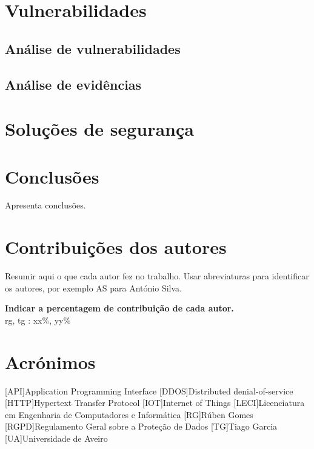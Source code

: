 \documentclass{report}
\begin{document}
\chapter{Vulnerabilidades}
\label{ch:vulnerabilidades}
\section{Análise de vulnerabilidades}
\section{Análise de evidências}

\chapter{Soluções de segurança}
\label{ch:solucoes-de-seguranca}

\chapter{Conclusões}
\label{ch:conclusoes}
Apresenta conclusões.

\chapter*{Contribuições dos autores}
Resumir aqui o que cada autor fez no trabalho.
Usar abreviaturas para identificar os autores,
por exemplo AS para António Silva.

\vspace{10pt}
\textbf{Indicar a percentagem de contribuição de cada autor.}\\

\ac{rg}, \ac{tg} : xx\%, yy\%\\


\chapter*{Acrónimos}
\begin{acronym}
    [API]{Application Programming Interface}
    [DDOS]{Distributed denial-of-service}
    [HTTP]{Hypertext Transfer Protocol}
    [IOT]{Internet of Things}
    [LECI]{Licenciatura em Engenharia de Computadores e Informática}
    [RG]{Rúben Gomes}
    [RGPD]{Regulamento Geral sobre a Proteção de Dados}
    [TG]{Tiago Garcia}
    [UA]{Universidade de Aveiro}
\end{acronym}


\printbibliography
\end{document}
